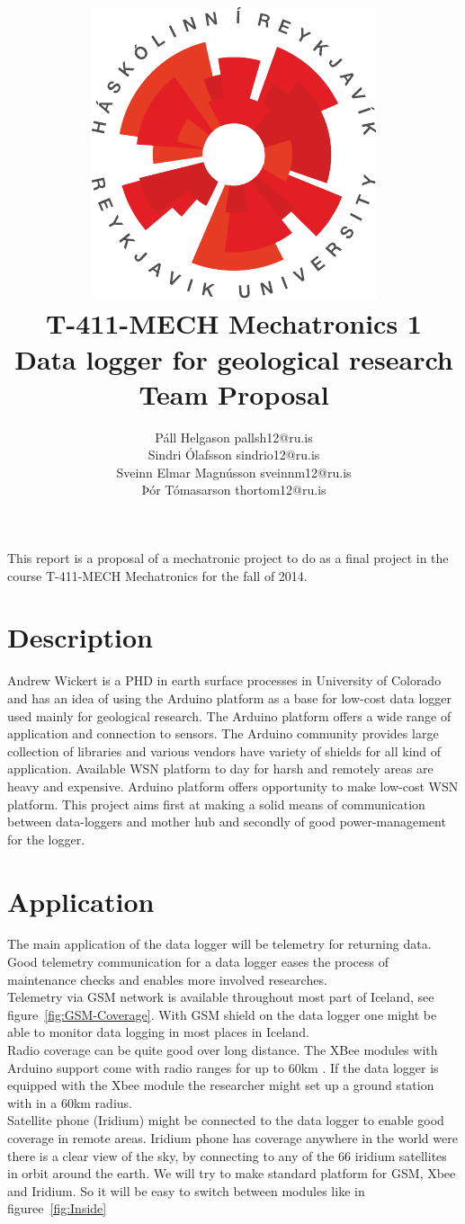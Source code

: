 \documentclass[12pt,a4paper,titlepage]{article}
\author{Páll Helgason pallsh12@ru.is\\Sindri Ólafsson sindrio12@ru.is\\Sveinn Elmar Magnússon sveinnm12@ru.is\\Þór Tómasarson thortom12@ru.is}  %
\title{\includegraphics{graphics/ru-logo}\\\vspace{10mm}
T-411-MECH Mechatronics 1\\Data logger for geological research\\Team Proposal}  %
\begin{document}
\maketitle  %
\onehalfspacing %

This report is a proposal of a mechatronic project to do as a
final project in the course T-411-MECH Mechatronics for the fall of 2014.
 

\section{Description}
Andrew Wickert is a PHD in earth surface processes in University of Colorado and has an 
idea of using the Arduino platform as a base for low-cost data logger used mainly
for geological research. The Arduino platform offers a wide range of application and connection to 
sensors. The Arduino community provides large collection of libraries and various vendors have 
variety of shields for all kind of application. 
Available WSN platform \cite{WSN} to day for harsh and remotely areas are heavy and expensive.
Arduino platform offers opportunity to make low-cost WSN platform.
This project aims first at making a solid means of communication between data-loggers and mother hub
and secondly of good power-management for the logger. 


\section{Application}

The main application of the data logger will be telemetry for returning data. Good telemetry communication for a data logger eases the process of maintenance checks and enables more involved researches.\\
Telemetry via GSM network is available throughout most part of Iceland, see figure~\ref{fig:GSM-Coverage}. With GSM shield on the data logger one might be able to monitor data logging in most places in Iceland.\\
Radio coverage can be quite good over long distance. The XBee modules with Arduino support come with radio ranges for up to 60km \cite{Xbee}. If the data logger is equipped with the Xbee module the researcher might set up a ground station with in a 60km radius.\\
Satellite phone (Iridium) might be connected to the data logger to enable good coverage in remote areas. Iridium phone has coverage anywhere in the world were there is a clear view of the sky, by connecting to any of the 66 iridium satellites in orbit around the earth\cite{iridium}. We will try to make standard platform for GSM, Xbee and Iridium. So it will be easy to switch between modules like in figuree~\ref*{fig:Inside} 
\end{document}
